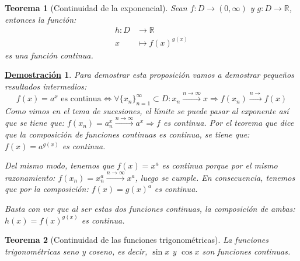 \documentclass[10pt,a4paper,openright]{book}
\theoremstyle{break}
\newtheorem{theo}{Teorema}[chapter]
\newtheorem*{demo}{\underline{Demostración}}
\begin{document}
\begin{theo}[Continuidad de la exponencial]
Sean $f: D\rightarrow (0,\infty)$ y $g: D\rightarrow \mathbb R$, entonces la función:
\begin{eqnarray*}
h: D &\longrightarrow \mathbb R \\
x &\longmapsto f(x)^{g(x)}
\end{eqnarray*}
es una función continua. 
\end{theo}
\begin{demo}
Para demostrar esta proposición vamos a demostrar pequeños resultados intermedios:
$$f(x)=a^x \mbox{ es continua} \Leftrightarrow \forall\{x_n\}_{n=1}^\infty\subset D: x_n\xrightarrow{n\rightarrow\infty} x\Rightarrow f(x_n)\xrightarrow{n\rightarrow} f(x)$$
Como vimos en el tema de sucesiones, el límite se puede pasar al exponente así que se tiene que: $f(x_n)=a^x_n\xrightarrow{n\rightarrow\infty} a^x\Rightarrow f$ es continua. Por el teorema que dice que la composición de funciones continuas es continua, se tiene que: $f(x)=a^{g(x)}$ es continua.

Del mismo modo, tenemos que $f(x)=x^a$ es continua porque por el mismo razonamiento: $f(x_n)=x_n^a\xrightarrow{n\rightarrow\infty} x^a$, luego se cumple. En consecuencia, tenemos que por la composición: $f(x)=g(x)^a$ es continua.

Basta con ver que al ser estas dos funciones continuas, la composición de ambas: $h(x)=f(x)^{g(x)}$ es continua.
\end{demo}

\begin{theo}[Continuidad de las funciones trigonométricas]
La funciones trigonométricas seno y coseno, es decir, $\sin x$ y $\cos x$ son funciones continuas.
\end{theo}
\end{document}

